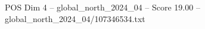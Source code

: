 \begin{textsample}{POS Dim 4 – global\_north\_2024\_04 – Score 19.00 – global\_north\_2024\_04/107346534.txt}
\end{textsample}
